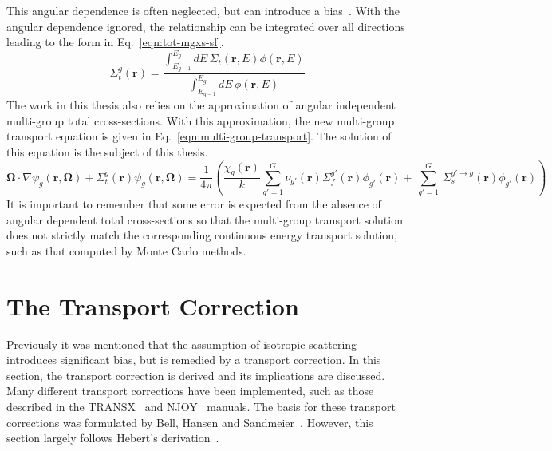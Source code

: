 This angular dependence is often neglected, but can introduce a bias~\cite{gibson-preprint}. With the angular dependence ignored, the relationship can be integrated over all directions leading to the form in Eq.~\ref{eqn:tot-mgxs-sf}.
\begin{equation}
\Sigma_{t}^g(\mathbf{r}) = \frac{\int_{E_{g-1}}^{E_g} dE \, \Sigma_{t}(\mathbf{r},E)\phi(\mathbf{r},E)}{\int_{E_{g-1}}^{E_g} dE \, \phi(\mathbf{r},E)} 
\label{eqn:tot-mgxs-sf}
\end{equation}
The work in this thesis also relies on the approximation of angular independent multi-group total cross-sections. With this approximation, the new multi-group transport equation is given in Eq.~\ref{eqn:multi-group-transport}. The solution of this equation is the subject of this thesis. 
\begin{equation}
\mathbf{\Omega} \cdot \nabla \psi_{g}(\mathbf{r},\mathbf{\Omega}) + \Sigma_t^{g}(\mathbf{r}) \psi_{g}(\mathbf{r},\mathbf{\Omega}) = \frac{1}{4 \pi} \left( \frac{\chi_{g}\left(\mathbf{r}\right)}{k} \sum_{g'=1}^{G} \nu_{g'}\left(\mathbf{r}\right) \Sigma_f^{g'}\left(\mathbf{r}\right) \phi_{g'}\left(\mathbf{r}\right) + \, \sum_{g'=1}^G \,  \Sigma_{s}^{g' \rightarrow g}\left(\mathbf{r}\right) \phi_{g'}(\mathbf{r}) \right)
\label{eqn:multi-group-transport}
\end{equation}
It is important to remember that some error is expected from the absence of angular dependent total cross-sections so that the multi-group transport solution does not strictly match the corresponding continuous energy transport solution, such as that computed by Monte Carlo methods.

\section{The Transport Correction}
\label{sec:transport-correction}

Previously it was mentioned that the assumption of isotropic scattering introduces significant bias, but is remedied by a transport correction. In this section, the transport correction is derived and its implications are discussed. Many different transport corrections have been implemented, such as those described in the TRANSX~\cite{macfarlane1993transx} and NJOY~\cite{macfarlane2000njoy} manuals. The basis for these transport corrections was formulated by Bell, Hansen and Sandmeier~\cite{bell1967transport}. However, this section largely follows Hebert's derivation~\cite{hebert2009applied}. 


